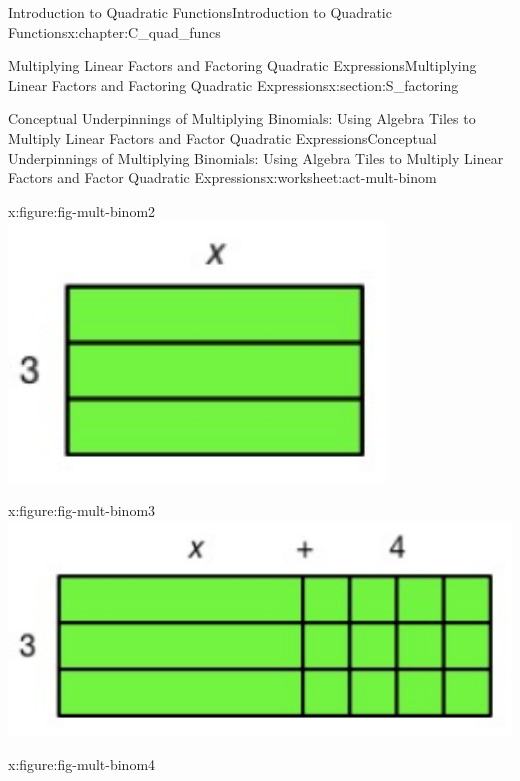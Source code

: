 \documentclass[oneside,10pt,]{book}
\numberwithin{equation}{chapter}
\begin{document}
\begin{chapterptx}{Introduction to Quadratic Functions}{}{Introduction to Quadratic Functions}{}{}{x:chapter:C_quad_funcs}
\begin{sectionptx}{Multiplying Linear Factors and Factoring Quadratic Expressions}{}{Multiplying Linear Factors and Factoring Quadratic Expressions}{}{}{x:section:S_factoring}
\begin{worksheet-subsection}{Conceptual Underpinnings of Multiplying Binomials: Using Algebra Tiles to Multiply Linear Factors and Factor Quadratic Expressions}{}{Conceptual Underpinnings of Multiplying Binomials: Using Algebra Tiles to Multiply Linear Factors and Factor Quadratic Expressions}{}{}{x:worksheet:act-mult-binom}
\begin{introduction}{}
\begin{sidebyside}{3}{0}{0}{0}
\begin{sbspanel}{0.333333333333333}
\begin{figureptx}{}{x:figure:fig-mult-binom2}{}
\includegraphics[width=\linewidth]{external/mult-binom2.pdf}
\tcblower
\end{figureptx}%
\end{sbspanel}%
\begin{sbspanel}{0.333333333333333}%
\begin{figureptx}{}{x:figure:fig-mult-binom3}{}%
\includegraphics[width=\linewidth]{external/mult-binom3.pdf}
\tcblower
\end{figureptx}%
\end{sbspanel}%
\end{sidebyside}%
 \begin{sidebyside}{2}{0}{0}{0}%
\begin{sbspanel}{0.5}%
\begin{figureptx}{}{x:figure:fig-mult-binom4}{}%

\end{figureptx}
\end{sbspanel}
\end{sidebyside}
\end{introduction}
\end{worksheet-subsection}
\end{sectionptx}
\end{chapterptx}
\end{document}
